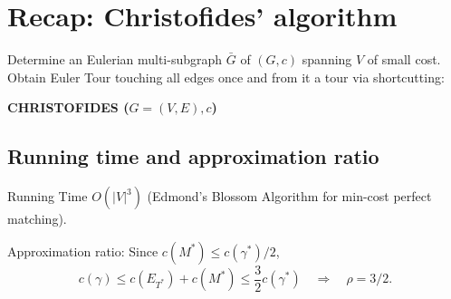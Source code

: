 \section{Recap: Christofides' algorithm}
Determine an Eulerian multi-subgraph $\bar G$ of $(G,c)$ spanning $V$ of small cost. Obtain Euler Tour touching all edges once and from it a tour via shortcutting:
\begin{notesalgorithm}
\textbf{CHRISTOFIDES ($G=(V,E),c$)}
\begin{notespseudocode}
\end{notespseudocode}
\end{notesalgorithm}
\subsection{Running time and approximation ratio}
Running Time $O(|V|^3)$ (Edmond's Blossom Algorithm for min-cost perfect matching).

Approximation ratio: Since $c(M^*)\leq c(\gamma^*)/2$,
\[c(\gamma)\leq c(E_{T^*})+c(M^*)\leq\frac32c(\gamma^*)
\quad\Rightarrow\quad\rho=3/2.\]
